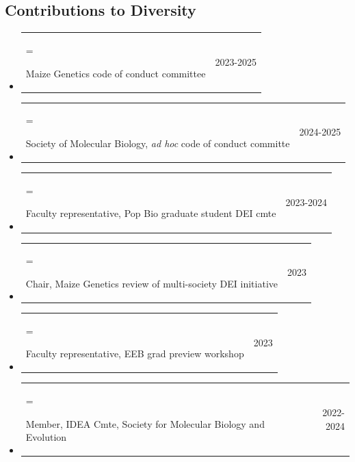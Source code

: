 \documentclass[letterpaper,10pt]{article}
\makeatletter
\newlength{\cvhang}\setlength{\cvhang}{1.5em}
\newcommand{\cvitem}[3][\cvhang]{%
  \item\begin{tabularx}{\dimexpr\linewidth+\cvhang\relax}{@{}>{\hangindent=#1\hangafter=1\raggedright\arraybackslash}X@{\hspace{1.5em}}r@{}}
    #2 & #3
  \end{tabularx}%
}
\makeatother
\begin{document}


\subsection*{Contributions to Diversity}
\begin{itemize}
  \cvitem{Maize Genetics code of conduct committee}{2023-2025}%
  \cvitem{Society of Molecular Biology, \textit{ad hoc} code of conduct committe}{2024-2025}%
  \cvitem{Faculty representative, Pop Bio graduate student DEI cmte}{2023-2024}
  \cvitem{Chair, Maize Genetics review of multi-society DEI initiative}{2023}
  \cvitem{Faculty representative, EEB grad preview workshop}{2023}
  \cvitem{Member, IDEA Cmte, Society for Molecular Biology and Evolution}{2022-2024}
\end{itemize}
\end{document}
